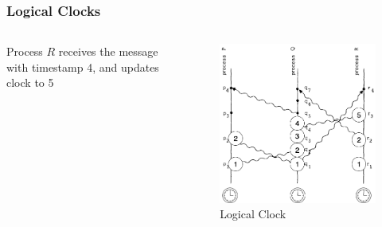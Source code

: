 \documentclass{beamer}
\begin{document}
\frame
{
	\frametitle{Logical Clocks}

	\begin{columns}
	\begin{column}{0.6\textwidth}

		Process $R$ receives the message with timestamp 4, and updates clock to 5


	\end{column}
	\begin{column}{0.4\textwidth}

		\begin{figure}[ht!]
		\includegraphics[width=\textwidth]{files/ClockDist-Impl-Logical-Clock-4.png}
		\caption{Logical Clock}
		\end{figure}


	\end{column}
	\end{columns}


}
\end{document}
